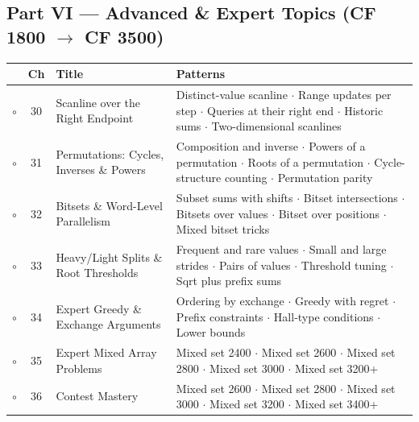 \subsection*{Part VI --- Advanced \& Expert Topics (CF 1800 $\to$ CF 3500)}
\begin{tabularx}{\linewidth}{@{}c c >{\raggedright\arraybackslash}p{3.6cm} X@{}}
\toprule
& \textbf{Ch} & \textbf{Title} & \textbf{Patterns} \\
\midrule
$\circ$ & 30 & Scanline over the Right Endpoint & Distinct-value scanline $\cdot$ Range updates per step $\cdot$ Queries at their right end $\cdot$ Historic sums $\cdot$ Two-dimensional scanlines \\
$\circ$ & 31 & Permutations: Cycles, Inverses \& Powers & Composition and inverse $\cdot$ Powers of a permutation $\cdot$ Roots of a permutation $\cdot$ Cycle-structure counting $\cdot$ Permutation parity \\
$\circ$ & 32 & Bitsets \& Word-Level Parallelism & Subset sums with shifts $\cdot$ Bitset intersections $\cdot$ Bitsets over values $\cdot$ Bitset over positions $\cdot$ Mixed bitset tricks \\
$\circ$ & 33 & Heavy/Light Splits \& Root Thresholds & Frequent and rare values $\cdot$ Small and large strides $\cdot$ Pairs of values $\cdot$ Threshold tuning $\cdot$ Sqrt plus prefix sums \\
$\circ$ & 34 & Expert Greedy \& Exchange Arguments & Ordering by exchange $\cdot$ Greedy with regret $\cdot$ Prefix constraints $\cdot$ Hall-type conditions $\cdot$ Lower bounds \\
$\circ$ & 35 & Expert Mixed Array Problems & Mixed set 2400 $\cdot$ Mixed set 2600 $\cdot$ Mixed set 2800 $\cdot$ Mixed set 3000 $\cdot$ Mixed set 3200+ \\
$\circ$ & 36 & Contest Mastery & Mixed set 2600 $\cdot$ Mixed set 2800 $\cdot$ Mixed set 3000 $\cdot$ Mixed set 3200 $\cdot$ Mixed set 3400+ \\
\bottomrule
\end{tabularx}
\endgroup
